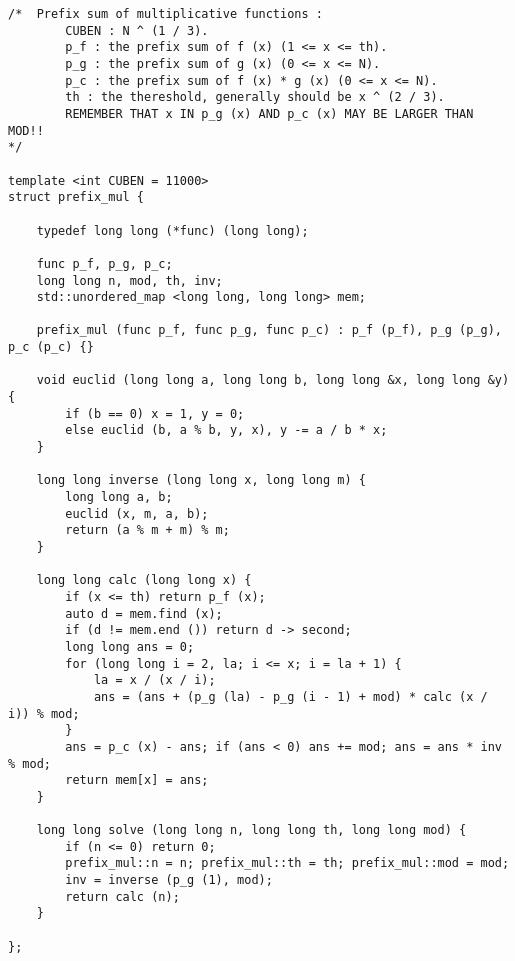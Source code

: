 \begin{lstlisting}
/*	Prefix sum of multiplicative functions :
		CUBEN : N ^ (1 / 3).
		p_f : the prefix sum of f (x) (1 <= x <= th).
		p_g : the prefix sum of g (x) (0 <= x <= N).
		p_c : the prefix sum of f (x) * g (x) (0 <= x <= N).
		th : the thereshold, generally should be x ^ (2 / 3).
		REMEMBER THAT x IN p_g (x) AND p_c (x) MAY BE LARGER THAN MOD!!
*/

template <int CUBEN = 11000>
struct prefix_mul {

	typedef long long (*func) (long long);

	func p_f, p_g, p_c;
	long long n, mod, th, inv;
	std::unordered_map <long long, long long> mem;

	prefix_mul (func p_f, func p_g, func p_c) : p_f (p_f), p_g (p_g), p_c (p_c) {}

	void euclid (long long a, long long b, long long &x, long long &y) {
		if (b == 0) x = 1, y = 0;
		else euclid (b, a % b, y, x), y -= a / b * x;
	}

	long long inverse (long long x, long long m) {
		long long a, b;
		euclid (x, m, a, b);
		return (a % m + m) % m;
	}

	long long calc (long long x) {
		if (x <= th) return p_f (x);
		auto d = mem.find (x);
		if (d != mem.end ()) return d -> second;
		long long ans = 0;
		for (long long i = 2, la; i <= x; i = la + 1) {
			la = x / (x / i);
			ans = (ans + (p_g (la) - p_g (i - 1) + mod) * calc (x / i)) % mod;
		}
		ans = p_c (x) - ans; if (ans < 0) ans += mod; ans = ans * inv % mod;
		return mem[x] = ans;
	}

	long long solve (long long n, long long th, long long mod) {
		if (n <= 0) return 0;
		prefix_mul::n = n; prefix_mul::th = th; prefix_mul::mod = mod;
		inv = inverse (p_g (1), mod);
		return calc (n); 
	}

};
\end{lstlisting}

